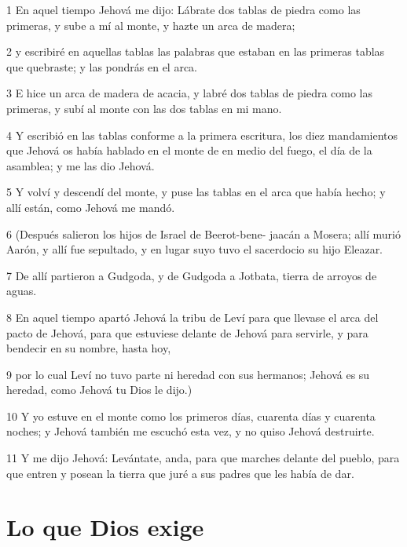 \par 1 En aquel tiempo Jehová me dijo: Lábrate dos tablas de piedra como las primeras, y sube a mí al monte, y hazte un arca de madera;
\par 2 y escribiré en aquellas tablas las palabras que estaban en las primeras tablas que quebraste; y las pondrás en el arca.
\par 3 E hice un arca de madera de acacia, y labré dos tablas de piedra como las primeras, y subí al monte con las dos tablas en mi mano.
\par 4 Y escribió en las tablas conforme a la primera escritura, los diez mandamientos que Jehová os había hablado en el monte de en medio del fuego, el día de la asamblea; y me las dio Jehová.
\par 5 Y volví y descendí del monte, y puse las tablas en el arca que había hecho; y allí están, como Jehová me mandó.
\par 6 (Después salieron los hijos de Israel de Beerot-bene- jaacán a Mosera; allí murió Aarón, y allí fue sepultado, y en lugar suyo tuvo el sacerdocio su hijo Eleazar.
\par 7 De allí partieron a Gudgoda, y de Gudgoda a Jotbata, tierra de arroyos de aguas.
\par 8 En aquel tiempo apartó Jehová la tribu de Leví  para que llevase el arca del pacto de Jehová, para que estuviese delante de Jehová para servirle, y para bendecir en su nombre, hasta hoy,
\par 9 por lo cual Leví no tuvo parte ni heredad con sus hermanos; Jehová es su heredad, como Jehová tu Dios le dijo.)
\par 10 Y yo estuve en el monte como los primeros días, cuarenta días y cuarenta noches; y Jehová también me escuchó esta vez, y no quiso Jehová destruirte.
\par 11 Y me dijo Jehová: Levántate, anda, para que marches delante del pueblo, para que entren y posean la tierra que juré a sus padres que les había de dar.

\section{Lo que Dios exige}

